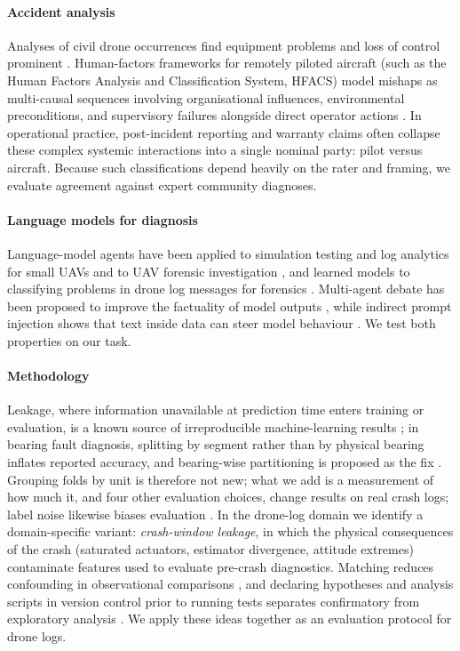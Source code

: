 \documentclass[preprint,12pt]{elsarticle}
\begin{document}
\paragraph{Accident analysis} Analyses of civil drone occurrences find equipment problems and loss of control
prominent \cite{wild2016drone}. Human-factors frameworks for remotely piloted aircraft (such as the Human Factors
Analysis and Classification System, HFACS) model mishaps as multi-causal sequences involving organisational influences,
environmental preconditions, and supervisory failures alongside direct operator actions \cite{wiegmann2003hfacs,tvaryanas2006hfacs}.
In operational practice, post-incident reporting and warranty claims often collapse these complex systemic interactions into
a single nominal party: pilot versus aircraft. Because such classifications depend heavily on the rater and framing,
we evaluate agreement against expert community diagnoses.

\paragraph{Language models for diagnosis} Language-model agents have been applied to simulation testing and log
analytics for small UAVs \cite{duvvuru2025llm} and to UAV forensic investigation \cite{li2026ufa}, and learned models to classifying problems in drone log messages for
forensics \cite{silalahi2026droptc}. Multi-agent debate has been proposed to improve the factuality of model outputs
\cite{du2024debate}, while indirect prompt injection shows that text inside data can steer model behaviour
\cite{greshake2023injection}. We test both properties on our task.

\paragraph{Methodology} Leakage, where information unavailable at prediction time enters training or evaluation, is a
known source of irreproducible machine-learning results \cite{kaufman2012leakage,kapoor2023leakage}; in bearing fault diagnosis, splitting by segment rather than by physical bearing inflates reported accuracy, and bearing-wise partitioning is proposed as the fix \cite{vieira2025bearing}. Grouping folds by unit is therefore not new; what we add is a measurement of how much it, and four other evaluation choices, change results on real crash logs; label noise
likewise biases evaluation \cite{frenay2014label}. In the drone-log domain we identify a domain-specific variant:
\textit{crash-window leakage}, in which the physical consequences of the crash (saturated actuators, estimator divergence,
attitude extremes) contaminate features used to evaluate pre-crash diagnostics. Matching reduces confounding in
observational comparisons \cite{stuart2010matching}, and declaring hypotheses and analysis scripts in version control
prior to running tests separates confirmatory from exploratory analysis \cite{nosek2018prereg}. We apply these ideas
together as an evaluation protocol for drone logs.
\end{document}

